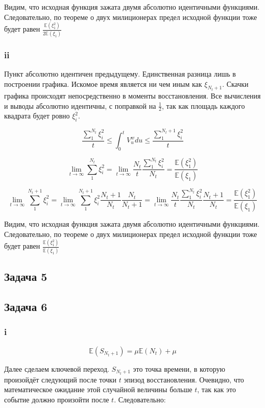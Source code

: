 \documentclass[a4paper,12pt]{article}
\def \mbb{\mathbb}
\def \E{\mbb{E}}
\begin{document}
Видим, что исходная функция зажата двумя абсолютно идентичными функциями. Следовательно, по теореме о двух милиционерах предел исходной функции тоже будет равен $ \frac{\E(\xi_1^2)}{2 \E(\xi_1)} $




\subsubsection{ii}

Пункт абсолютно идентичен предыдущему. Единственная разница лишь в построении графика. Искомое время является ни чем иным как $ \xi_{N_t+1} $. Скачки графика происходят непосредственно в моменты восстановления. Все вычисления и выводы абсолютно идентичны, с поправкой на $ \frac{1}{2} $, так как площадь каждого квадрата будет ровно $ \xi_i^2 $.


\[ \frac{\sum_{1}^{N_t}\xi_i^2}{t} \le \int_{0}^{t}V_u^{w} du\le \frac{\sum_{1}^{N_t + 1}\xi_i^2}{t} \]

\[ \lim\limits_{t \to \infty} \sum_{1}^{N_t}\xi_i^2 = \lim\limits_{t \to \infty} \frac{N_t}{t}  \frac{\sum_{1}^{N_t}\xi_i^2 }{N_t} = \frac{\E(\xi_1^2)}{\E(\xi_1)} \]

\[ \lim\limits_{t \to \infty} \sum_{1}^{N_t + 1}\xi_i^2 = \lim\limits_{t \to \infty} \sum_{1}^{N_t + 1}\xi_i^2 \frac{N_t + 1}{N_t}  \frac{N_t}{N_t+1}= 
\lim\limits_{t \to \infty} \frac{N_t}{t}  \frac{\sum_{1}^{N_t}\xi_i^2 }{ N_t} \frac{N_t + 1}{N_t} = \frac{\E(\xi_1^2)}{ \E(\xi_1)} \]

Видим, что исходная функция зажата двумя абсолютно идентичными функциями. Следовательно, по теореме о двух милиционерах предел исходной функции тоже будет равен $ \frac{\E(\xi_1^2)}{ \E(\xi_1)} $


\subsection{Задача 5}

\subsection{Задача 6}

\subsubsection{i}

\[  \E(S_{N_t+1}) = \mu \E(N_t) + \mu\]

Далее сделаем ключевой переход. $ S_{N_t+1} $ это точка времени, в которую произойдёт следующий после точки $ t $  эпизод восстановления. Очевидно, что математическое ожидание этой случайной величины больше $ t $, так как это событие должно произойти после $ t $. Следовательно:
\end{document}

